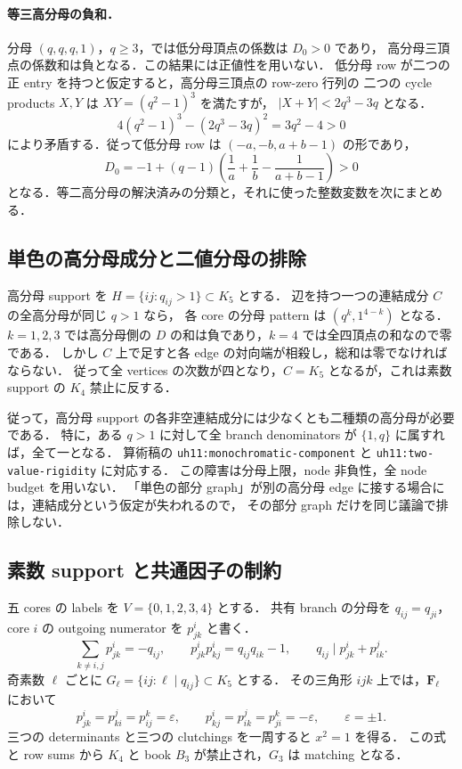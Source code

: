 \paragraph{等三高分母の負和．}
分母 $(q,q,q,1)$，$q\geq3$，では低分母頂点の係数は $D_0>0$ であり，
高分母三頂点の係数和は負となる．この結果には正値性を用いない．
低分母 row が二つの正 entry を持つと仮定すると，高分母三頂点の row-zero 行列の
二つの cycle products $X,Y$ は $XY=(q^2-1)^3$ を満たすが，
$|X+Y|<2q^3-3q$ となる．
\[
 4(q^2-1)^3-(2q^3-3q)^2=3q^2-4>0
\]
により矛盾する．従って低分母 row は $(-a,-b,a+b-1)$ の形であり，
\[
 D_0=-1+(q-1)\left(\frac1a+\frac1b-\frac1{a+b-1}\right)>0
\]
となる．等二高分母の解決済みの分類と，それに使った整数変数を次にまとめる．



\subsection{単色の高分母成分と二値分母の排除}

高分母 support を $H=\{ij:q_{ij}>1\}\subset K_5$ とする．
辺を持つ一つの連結成分 $C$ の全高分母が同じ $q>1$ なら，
各 core の分母 pattern は $(q^k,1^{4-k})$ となる．
$k=1,2,3$ では高分母側の $D$ の和は負であり，$k=4$ では全四頂点の和なので零である．
しかし $C$ 上で足すと各 edge の対向端が相殺し，総和は零でなければならない．
従って全 vertices の次数が四となり，$C=K_5$ となるが，これは素数 support の
$K_4$ 禁止に反する．

従って，高分母 support の各非空連結成分には少なくとも二種類の高分母が必要である．
特に，ある $q>1$ に対して全 branch denominators が $\{1,q\}$ に属すれば，全て一となる．
算術稿の \texttt{uh11:monochromatic-component} と
\texttt{uh11:two-value-rigidity} に対応する．
この障害は分母上限，node 非負性，全 node budget を用いない．
「単色の部分 graph」が別の高分母 edge に接する場合には，連結成分という仮定が失われるので，
その部分 graph だけを同じ議論で排除しない．

\subsection{素数 support と共通因子の制約}

五 cores の labels を $V=\{0,1,2,3,4\}$ とする．
共有 branch の分母を $q_{ij}=q_{ji}$，core $i$ の outgoing numerator を $p^i_{jk}$ と書く．
\[
 \sum_{k\ne i,j}p^i_{jk}=-q_{ij},\qquad
 p^i_{jk}p^i_{kj}=q_{ij}q_{ik}-1,\qquad
 q_{ij}\mid p^i_{jk}+p^j_{ik}.
\]
奇素数 $\ell$ ごとに $G_\ell=\{ij:\ell\mid q_{ij}\}\subset K_5$ とする．
その三角形 $ijk$ 上では，$\mathbf F_\ell$ において
\[
 p^i_{jk}=p^j_{ki}=p^k_{ij}=\varepsilon,\qquad
 p^i_{kj}=p^j_{ik}=p^k_{ji}=-\varepsilon,
 \qquad\varepsilon=\pm1.
\]
三つの determinants と三つの clutchings を一周すると $x^2=1$ を得る．
この式と row sums から $K_4$ と book $B_3$ が禁止され，$G_3$ は matching となる．

